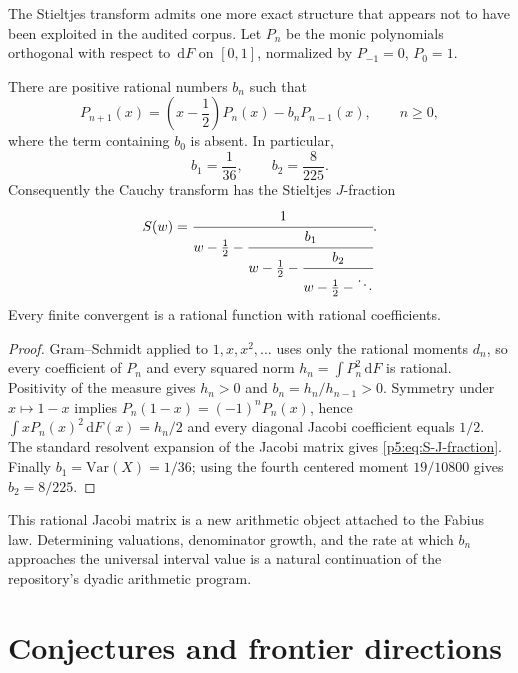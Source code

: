 \documentclass[11pt,oneside]{article}
\theoremstyle{definition}
\theoremstyle{remark}
\newcommand{\dd}{\,\mathrm d}
\newcommand{\1}{\mathbf 1}
\begin{document}
The Stieltjes transform admits one more exact structure that appears not to have been exploited in the audited corpus.  Let $P_n$ be the monic polynomials orthogonal with respect to $\dd F$ on $[0,1]$, normalized by $P_{-1}=0$, $P_0=1$.

\begin{proposition}\label{p5:prop:rational-Jacobi}
There are positive rational numbers $b_n$ such that
\begin{equation}\label{p5:eq:orthogonal-recurrence}
 P_{n+1}(x)=\left(x-\frac12\right)P_n(x)-b_nP_{n-1}(x),
 \qquad n\ge0,
\end{equation}
where the term containing $b_0$ is absent.  In particular,
\begin{equation}\label{p5:eq:first-Jacobi}
 b_1=\frac1{36},
 \qquad b_2=\frac8{225}.
\end{equation}
Consequently the Cauchy transform has the Stieltjes $J$-fraction
\begin{equation}\label{p5:eq:S-J-fraction}
 S(w)=\cfrac{1}{w-\frac12-
 \cfrac{b_1}{w-\frac12-
 \cfrac{b_2}{w-\frac12-\ddots}}}.
\end{equation}
Every finite convergent is a rational function with rational coefficients.
\end{proposition}

\begin{proof}
Gram--Schmidt applied to $1,x,x^2,\ldots$ uses only the rational moments $d_n$, so every coefficient of $P_n$ and every squared norm
$h_n=\int P_n^2\dd F$ is rational.  Positivity of the measure gives $h_n>0$ and $b_n=h_n/h_{n-1}>0$.  Symmetry under $x\mapsto1-x$ implies
$P_n(1-x)=(-1)^nP_n(x)$, hence
$\int xP_n(x)^2\dd F(x)=h_n/2$ and every diagonal Jacobi coefficient equals $1/2$.  The standard resolvent expansion of the Jacobi matrix gives \eqref{p5:eq:S-J-fraction}.  Finally \(b_1=\mathrm{Var}(X)=1/36\); using the fourth centered moment $19/10800$ gives $b_2=8/225$.
\end{proof}

This rational Jacobi matrix is a new arithmetic object attached to the Fabius law.  Determining valuations, denominator growth, and the rate at which $b_n$ approaches the universal interval value is a natural continuation of the repository's dyadic arithmetic program.

\section{Conjectures and frontier directions}
\end{document}

